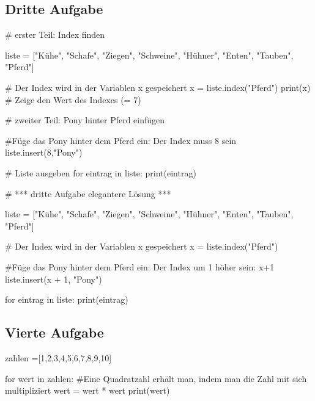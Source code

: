 \documentclass{\VorlagenPfad/coderdojokatext}
\begin{document}
\subsection{Dritte Aufgabe}
\begin{pythoncode}

# erster Teil: Index finden

liste = ["Kühe", "Schafe", "Ziegen", "Schweine", "Hühner",
 "Enten", "Tauben", "Pferd"]

# Der Index wird in der Variablen x gespeichert
x = liste.index("Pferd")	
print(x) # Zeige den Wert des Indexes (= 7)

# zweiter Teil: Pony hinter Pferd einfügen

#Füge das Pony hinter dem Pferd ein: Der Index  muss 8 sein
liste.insert(8,"Pony")	

# Liste ausgeben
for eintrag in liste:	
	print(eintrag)


# *** dritte Aufgabe  elegantere Lösung ***

liste = ["Kühe", "Schafe", "Ziegen", "Schweine", "Hühner",
 "Enten", "Tauben", "Pferd"]

# Der Index wird in der Variablen x gespeichert
x = liste.index("Pferd")      	

#Füge das Pony hinter dem Pferd ein: Der Index um 1 höher sein: x+1
liste.insert(x + 1, "Pony")     	

for eintrag in liste:
	print(eintrag)


\end{pythoncode}

\subsection{Vierte Aufgabe}

\begin{pythoncode}

zahlen =[1,2,3,4,5,6,7,8,9,10]

for wert in zahlen:
	#Eine Quadratzahl erhält man, indem man die Zahl mit sich multipliziert 
	wert = wert * wert	
	print(wert)	
\end{pythoncode}
\end{document}

